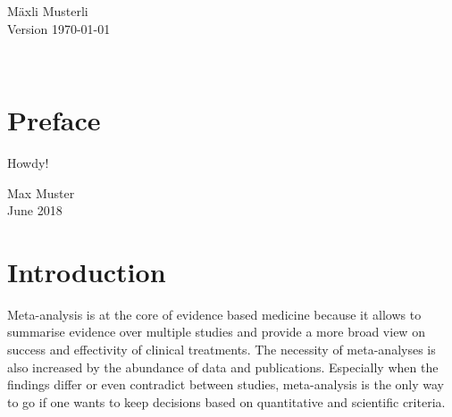 \documentclass[11pt,a4paper,twoside]{book}\usepackage[]{graphicx}\usepackage[]{color}
\begin{document}





\graphicspath{{./figure/}}
\setcounter{tocdepth}{1}



\thispagestyle{empty}
\begin{center}
  \vspace*{6cm}{\bfseries\Huge
  $p$-values:\\[5mm] their use, abuse and proper use \\[5mm]
  illustrated with seven facets 
  }
  \vfill
  \rm

  \LARGE
  M\"axli Musterli\\[12mm]
  
  \normalsize
  Version \today
\end{center}
\newpage
\thispagestyle{empty}~
\newpage
{}

\thispagestyle{plain}
\tableofcontents
{}

\chapter*{Preface}
\thispagestyle{plain}

Howdy!

\bigskip

\begin{flushright}
  Max Muster\\
  June 2018
\end{flushright}


\cleardoublepage
{}







\chapter{Introduction}

Meta-analysis is at the core of evidence based medicine because it allows to summarise evidence over multiple studies and provide a more broad view on success and effectivity of clinical treatments. The necessity of meta-analyses is also increased by the abundance of data and publications. Especially when the findings differ or even contradict between studies, meta-analysis is the only way to go if one wants to keep decisions based on quantitative and scientific criteria.
\end{document}
